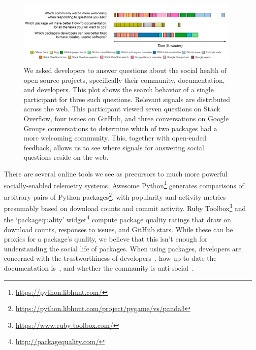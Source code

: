 \begin{figure}
\centering
\includegraphics[width=0.98\textwidth]{figures/visits}
\caption{%
We asked developers to answer questions about the social health of open source projects,
specifically their community, documentation, and developers.
This plot shows the search behavior of a single participant for three such questions.
Relevant signals are distributed across the web.
This participant viewed seven questions on Stack Overflow, four issues on GitHub, and three conversations on Google Groups conversations to determine which of two packages had a more welcoming community.
This, together with open-ended feedback, allows us to see where signals for answering social questions reside on the web.
}
\label{fig:visits}
\end{figure}

There are several online tools we see as precursors to much more powerful socially-enabled telemetry systems.
Awesome Python\footnote{\url{https://python.libhunt.com/}} generates comparisons of arbitrary pairs of Python packages\footnote{\url{https://python.libhunt.com/project/pygame/vs/panda3}}, with popularity and activity metrics presumably based on download counts and commit activity.
Ruby Toolbox\footnote{\url{https://www.ruby-toolbox.com/}} and the `packagequality' widget\footnote{\url{http://packagequality.com/}} compute package quality ratings that draw on download counts, responses to issues, and GitHub stars.
While these can be proxies for a package's quality, we believe that this isn't enough for understanding the social life of packages.
When using packages, developers are concerned with the trustworthiness of developers~\cite{robillard_field_2011}, how up-to-date the documentation is~\cite{storey_revolution_2014,nykaza_what_2002,lethbridge_how_2003,robillard_field_2011}, and whether the community is anti-social~\cite{storey_revolution_2014}.

